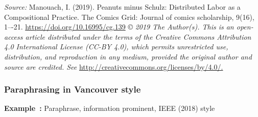 \documentclass[english, 12pt, a4paper, sci, utf8, a-2b, online]{aaltothesis}
\begin{document}
\vspace{1ex}
\noindent
{}

\vspace{1ex}
\noindent
\textit{Source:} Manouach, I. (2019). Peanuts minus Schulz: Distributed Labor as
a Compositional Practice. The Comics Grid: Journal of comics scholarship, 9(16), 
1–-21. \url{https://doi.org/10.16995/cg.139} \copyright{}
\textit{2019 The Author(s). This is an open-access article distributed under the
	terms of the Creative Commons Attribution 4.0 International License (CC-BY 
	4.0), which permits unrestricted use, distribution, and reproduction in any 
	medium, provided the original author and source are credited. See}
 \url{http://creativecommons.org/licenses/by/4.0/.}


\subsubsection*{Paraphrasing in Vancouver style}

\textsf{\textbf{Example~\theexample:}} Paraphrase, information prominent, IEEE 
(2018) style
\end{document}
